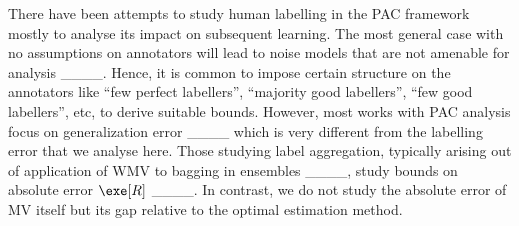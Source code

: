 

There have been attempts to study human labelling in the PAC framework mostly to analyse its impact on subsequent learning. The most general case with no assumptions on annotators will lead to noise models that are not amenable for analysis ____. Hence, it is common to impose certain structure on the annotators like ``few perfect labellers'', ``majority good labellers'', ``few good labellers'', etc, to derive suitable bounds. However, most works with PAC analysis focus on generalization error ____ which is very different from the labelling error that we analyse here. Those studying label aggregation, typically arising out of application of WMV to bagging in ensembles ____, study bounds on absolute error $\exe[R]$ ____. In contrast, we do not study the absolute error of MV itself but its gap relative to the optimal estimation method.



